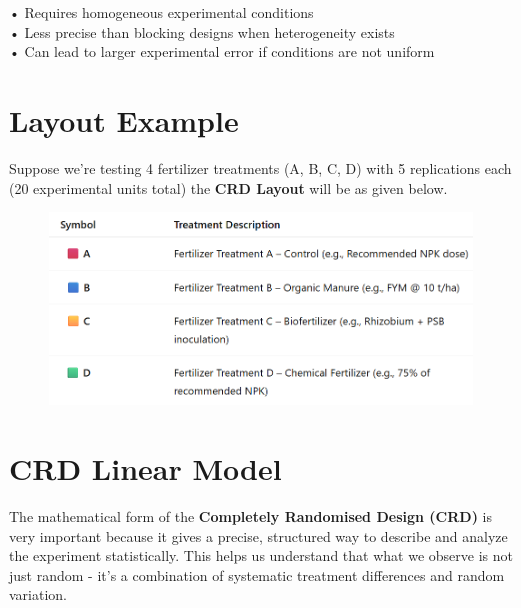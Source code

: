 \documentclass[
  letterpaper,
  DIV=11,
  numbers=noendperiod]{scrartcl}
\begin{document}
\begin{tcolorbox}[enhanced jigsaw, titlerule=0mm, title={Disadvantages}, bottomrule=.15mm, colback=white, opacityback=0, rightrule=.15mm, colframe=quarto-callout-warning-color-frame, toprule=.15mm, toptitle=1mm, leftrule=.75mm, left=2mm, arc=.35mm, breakable, coltitle=black, bottomtitle=1mm, colbacktitle=quarto-callout-warning-color!10!white, opacitybacktitle=0.6]

• Requires homogeneous experimental conditions\\
• Less precise than blocking designs when heterogeneity exists\\
• Can lead to larger experimental error if conditions are not uniform\\

\end{tcolorbox}

\hypertarget{layout-example}{%
\section{Layout Example}\label{layout-example}}

Suppose we're testing 4 fertilizer treatments (A, B, C, D) with 5
replications each (20 experimental units total) the \textbf{CRD Layout}
will be as given below.

\begin{figure}

{\centering \includegraphics{ssleg.webp}

}

\end{figure}

\hypertarget{crd-linear-model}{%
\section{CRD Linear Model}\label{crd-linear-model}}

The mathematical form of the \textbf{Completely Randomised Design (CRD)}
is very important because it gives a precise, structured way to describe
and analyze the experiment statistically. This helps us understand that
what we observe is not just random - it's a combination of systematic
treatment differences and random variation.
\end{document}

